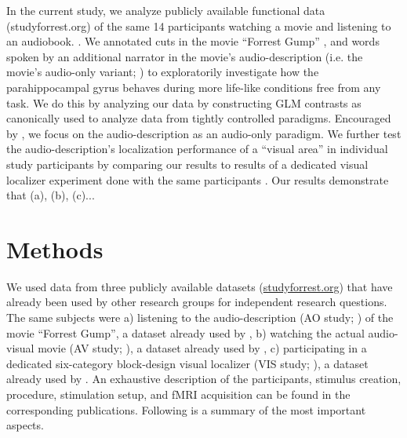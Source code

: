 \documentclass[english]{article}
\begin{document}
In the current study, we analyze publicly available functional data
(studyforrest.org) of the same 14 participants watching a movie
\citep{hanke2016simultaneous} and listening to an audiobook.
\citep{hanke2014audiomovie}.
We annotated cuts in the movie ``Forrest Gump'' \citep{ForrestGumpMovie}, and
words spoken by an additional narrator in the movie's audio-description (i.e.
the movie's audio-only variant; \citep{ForrestGumpGermanAD}) to exploratorily
investigate how the parahippocampal gyrus behaves during more life-like
conditions free from any task.
We do this by analyzing our data by constructing GLM contrasts as canonically
used to analyze data from tightly controlled paradigms.
Encouraged by \citep{aziz2008modulation}, we focus on the audio-description as
an audio-only paradigm. We further test the audio-description's localization
performance of a ``visual area'' in individual study participants by comparing
our results to results of a dedicated visual localizer experiment done with the
same participants \citep{sengupta2016extension}.
Our results demonstrate that (a), (b), (c)... 



\section{Methods}


We used data from three publicly available datasets
(\href{http://www.studyforrest.org}{studyforrest.org}) that have already been
used by other research groups for independent research questions.
The same subjects were
a) listening to the audio-description (AO study; \citep{hanke2014audiomovie}) of
the movie ``Forrest Gump'', a dataset already used by \citep{hu2017decoding,
nguyen2016integration},
b) watching the actual audio-visual movie (AV study;
\citep{hanke2016simultaneous}), a dataset already used by
\citep{ben2018hippocampal},
c) participating in a dedicated six-category block-design visual localizer (VIS
study; \citep{sengupta2016extension}), a dataset already used by
\citep{jiahui2019predicting}.
An exhaustive description of the participants, stimulus creation, procedure,
stimulation setup, and fMRI acquisition can be found in the corresponding
publications. Following is a summary of the most important aspects.
\end{document}
